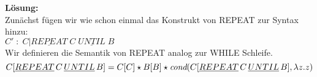 \documentclass[11pt,a4paper,ngerman]{article}
\begin{document}
\textbf{Lösung:}\\

   Zunächst fügen wir wie schon einmal das Konstrukt von REPEAT zur
   Syntax hinzu:\\
   
   $C' \; : \; C | \underline{REPEAT} \; C \; \underline{UNTIL} \; B$\\

   Wir definieren die Semantik von REPEAT analog zur WHILE Schleife.\\

   $$
      C [\underline{REPEAT} \, C \, \underline{UNTIL} \,B] 
         = C [C] \star B[B] \star \emph{cond} (C[\underline{REPEAT} \, C \, \underline{UNTIL} \, B],
            \lambda z.z)
   $$   


\label{LastPage}
\end{document}
